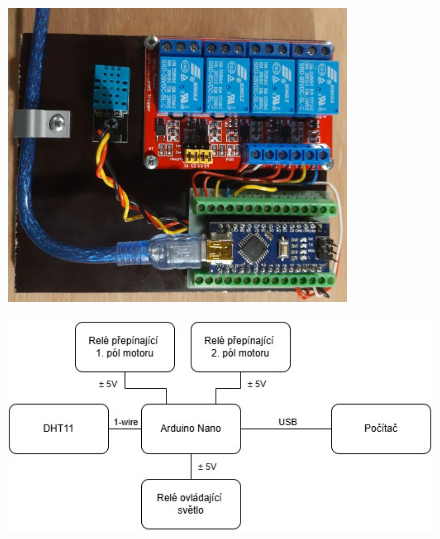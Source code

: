\begin{figure}[htbp]
    \centering
    \begin{minipage}[H]{0.8\textwidth}
        \centering
        \includegraphics[width=0.8\textwidth]{img/ridici_jednotka}
        \label{fig:ridici_jednotka}
    \end{minipage}
    \begin{minipage}[H]{0.8\textwidth}
        \centering
        \includegraphics[width=1.0\textwidth]{img/schema_ridici_jednotky}
        \label{fig:schema_ridici_jednotky}
    \end{minipage}
\end{figure}

